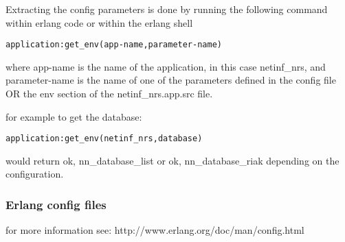 Extracting the config parameters is done by running the following command within erlang code or within the erlang shell

\begin {verbatim}
application:get_env(app-name,parameter-name) 
\end{verbatim}

where app-name is the name of the application, in this case netinf\_nrs, and parameter-name is the name of one of the parameters defined in the config file OR the env section of the netinf\_nrs.app.src file.

for example to get the database:

\begin {verbatim}
application:get_env(netinf_nrs,database) 
\end{verbatim}

would return {ok, nn\_database\_list} or {ok, nn\_database\_riak} depending on the configuration. 


\subsubsection  {Erlang config files}

for more information see: http://www.erlang.org/doc/man/config.html
